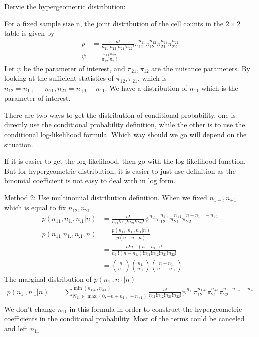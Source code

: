 \documentclass[11pt]{article} %
\begin{document}
\begin{itemize}
	Dervie the hypergeometric distribution:
	
	For a fixed sample size n, the joint distribution of the cell counts in the $2 \times 2$ table is given by
\begin{align*}
	p &=  \frac{n!}{n_{11}! n_{12}! n_{21}! n_{22}!} \pi_{11}^{n_{11}} \pi_{12}^{n_{12}} \pi_{21}^{n_{21}} \pi_{22}^{n_{22}}\\
	\psi &= \frac{\pi_{11} \pi_{22}}{\pi_{12}!\pi_{21}!} 
\end{align*}	
Let $\psi$ be the parameter of interest, and $\pi_{21}, \pi_{12}$ are the nuisance parameters. By looking at the sufficient statistics of $\pi_{12}, \pi_{21}$, which is $n_{12} = n_{1+} - n_{11} , n_{21} = n_{+1} - n_{11}$. We have a distribution of $n_{11}$ which is the parameter of interest. 

There are two ways to get the distribution of conditional probability, one is directly use the conditional probability definition, while the other is to use the conditional log-likelihood formula. Which way should we go will depend on the situation. 

If it is easier to get the log-likelihood, then go with the log-likelihood function. But for hypergeometric distribution, it is easier to just use definition as the binomial coefficient is not easy to deal with in log form.

Method 2: Use multinomial distribution definition. When we fixed $n_{1+}, n_{+1}$ which is equal to fix $n_{12}, n_{21}$
\begin{align*}
	p(n_{11}, n_{1.}, n_{.1}| n) &= \frac{n!}{n_{11}!n_{12}!n_{21}!n_{22}!} \psi^{n_{11}} \pi_{12}^{n_{1+}} \pi_{21}^{n_{+1}} \pi_{22}^{n-n_{1+}-n_{+1}}
	 \\
   p(n_{11}| n_{1.}, n_{.1}, n)	&=   \frac{p(n_{11}, n_{1.}, n_{.1}| n)}{p( n_{1.}, n_{.1}| n)}\\
   &= \frac{n! n_{1.}! (n-n_{1.})!}{n_{1.}! (n-n_{1.})! n_{11}!n_{12}!n_{21}!n_{22}!} \\
	&= {n \choose n_{1.}} {n_{1.} \choose n_{11}} {n-n_{1.} \choose n_{.1}-n_{11}} 
\end{align*}
The marginal distribution of $p( n_{1.}, n_{.1}| n)$
\begin{align*}
	p( n_{1.}, n_{.1}| n) &= \sum_{N_{11} \in \max{(0, -n + n_{1+} + n_{+1})}}^{\min{(n_{1+}, n_{+1})}} \frac{n!}{n_{11}!n_{12}!n_{21}!n_{22}!} \psi^{n_{11}} \pi_{12}^{n_{1+}} \pi_{21}^{n_{+1}} \pi_{22}^{n-n_{1+}-n_{+1}}
	\\
\end{align*}
We don't change $n_{11}$ in this formula in order to construct the hypergeometric coefficients in the conditional probability. Most of the terms could be canceled and left $n_{11}$ 


\end{itemize}
\end{document}
